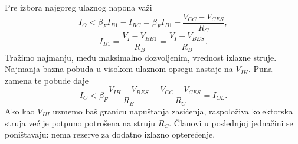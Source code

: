 Pre izbora najgoreg ulaznog napona važi
\[I_O<\beta_FI_{B1}-I_{RC}=\beta_FI_{B1}-\frac{V_{CC}-V_{CES}}{R_C},\]
\[I_{B1}=\frac{V_I-V_{BE1}}{R_B}=\frac{V_I-V_{BES}}{R_B}.\]
Tražimo najmanju, među maksimalno dozvoljenim, vrednost izlazne struje. Najmanja bazna pobuda u visokom ulaznom opsegu nastaje na $V_{IH}$. Puna zamena te pobude daje
\[I_O<\beta_F\frac{V_{IH}-V_{BES}}{R_B}-\frac{V_{CC}-V_{CES}}{R_C}=I_{OL}.\]
Ako kao $V_{IH}$ uzmemo baš granicu napuštanja zasićenja, raspoloživa kolektorska struja već je potpuno potrošena na struju $R_C$. Članovi u poslednjoj jednačini se poništavaju: nema rezerve za dodatno izlazno opterećenje.
